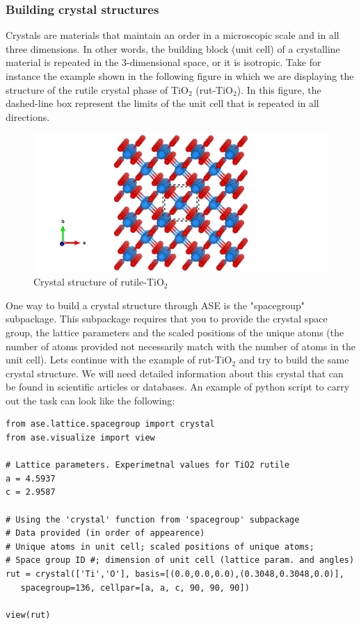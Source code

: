 \documentclass[11pt]{article}
\begin{document}
\subsubsection{Building crystal structures}
\label{sec:org155bd02}
Crystals are materials that maintain an order in a microscopic scale and in all three dimensions. In other words, the building block (unit cell) of a crystalline material is repeated in the 3-dimensional space, or it is isotropic. Take for instance the example shown in the following figure in which we are displaying the structure of the rutile crystal phase of TiO\(_{\text{2}}\) (rut-TiO\(_{\text{2}}\)). In this figure, the dashed-line box represent the limits of the unit cell that is repeated in all directions.

\begin{figure}[htbp]
\centering
\includegraphics[width=.9\linewidth]{./figures/rut-TiO2-ex.png}
\caption{Crystal structure of rutile-TiO\(_{\text{2}}\)}
\end{figure}

One way to build a crystal structure through ASE is the "spacegroup" subpackage. This subpackage requires that you to provide the crystal space group, the lattice parameters and the scaled positions of the unique atoms (the number of atoms provided not necessarily match with the number of atoms in the unit cell). Lets continue with the example of rut-TiO\(_{\text{2}}\) and try to build the same crystal structure. We will need detailed information about this crystal that can be found in scientific articles or databases. An example of python script to carry out the task can look like the following:

\begin{verbatim}
from ase.lattice.spacegroup import crystal
from ase.visualize import view

# Lattice parameters. Experimetnal values for TiO2 rutile
a = 4.5937
c = 2.9587

# Using the 'crystal' function from 'spacegroup' subpackage
# Data provided (in order of appearence)
# Unique atoms in unit cell; scaled positions of unique atoms;
# Space group ID #; dimension of unit cell (lattice param. and angles)
rut = crystal(['Ti','O'], basis=[(0.0,0.0,0.0),(0.3048,0.3048,0.0)],
   spacegroup=136, cellpar=[a, a, c, 90, 90, 90])

view(rut)
\end{verbatim}
\end{document}
